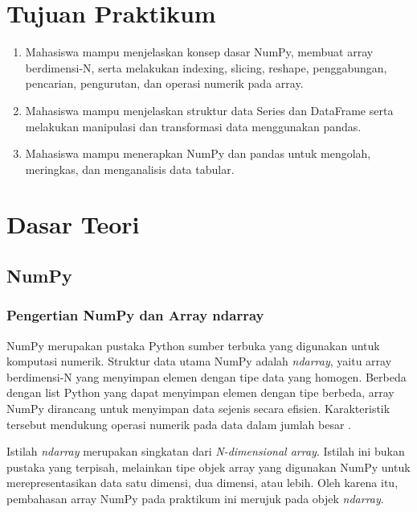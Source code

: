 \documentclass[a4paper,oneside,12pt]{report}
\begin{document}
\setcounter{page}{3}

\chapter[Tujuan Praktikum]{Tujuan Praktikum}
\begin{enumerate}
   \item Mahasiswa mampu menjelaskan konsep dasar NumPy, membuat array berdimensi-N, serta melakukan indexing, slicing, reshape, penggabungan, pencarian, pengurutan, dan operasi numerik pada array.
   \item Mahasiswa mampu menjelaskan struktur data Series dan DataFrame serta melakukan manipulasi dan transformasi data menggunakan pandas.
   \item Mahasiswa mampu menerapkan NumPy dan pandas untuk mengolah, meringkas, dan menganalisis data tabular.
\end{enumerate}
\clearpage

\chapter{Dasar Teori}

\section{NumPy}

\subsection{Pengertian NumPy dan Array ndarray}
NumPy merupakan pustaka Python sumber terbuka yang digunakan untuk komputasi
numerik. Struktur data utama NumPy adalah \textit{ndarray}, yaitu array
berdimensi-N yang menyimpan elemen dengan tipe data yang homogen. Berbeda
dengan list Python yang dapat menyimpan elemen dengan tipe berbeda, array NumPy
dirancang untuk menyimpan data sejenis secara efisien. Karakteristik tersebut
mendukung operasi numerik pada data dalam jumlah besar \cite{numpy-basics,petanikode-numpy}.

Istilah \textit{ndarray} merupakan singkatan dari \textit{N-dimensional array}.
Istilah ini bukan pustaka yang terpisah, melainkan tipe objek array yang
digunakan NumPy untuk merepresentasikan data satu dimensi, dua dimensi, atau
lebih. Oleh karena itu, pembahasan array NumPy pada praktikum ini merujuk pada
objek \textit{ndarray}.
\end{document}
